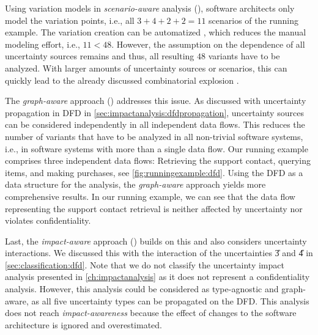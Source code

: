 Using variation models in \emph{scenario-aware} analysis (), software architects only model the variation points, i.e., all $3 + 4 + 2 + 2 = 11$ scenarios of the running example.
The variation creation can be automatized \cite{walter_architecture-based_2023}, which reduces the manual modeling effort, i.e., $11 < 48$.
However, the assumption on the dependence of all uncertainty sources remains and thus, all resulting $48$ variants have to be analyzed.
With larger amounts of uncertainty sources or scenarios, this can quickly lead to the already discussed combinatorial explosion \cite{koziolek_automated_2011}.

The \emph{graph-aware} approach () addresses this issue.
As discussed with uncertainty propagation in \ac{DFD} in \autoref{sec:impactanalysis:dfdpropagation}, uncertainty sources can be considered independently in all independent data flows.
This reduces the number of variants that have to be analyzed in all non-trivial software systems, i.e., in software systems with more than a single data flow.
Our running example comprises three independent data flows: Retrieving the support contact, querying items, and making purchases, see \autoref{fig:runningexample:dfd}.
Using the \ac{DFD} as a data structure for the analysis, the \emph{graph-aware} approach yields more comprehensive results.
In our running example, we can see that the data flow representing the support contact retrieval is neither affected by uncertainty nor violates confidentiality.

Last, the \emph{impact-aware} approach () builds on this and also considers uncertainty interactions.
We discussed this with the interaction of the uncertainties \U{3} and \U{4} in \autoref{sec:classification:dfd}.
Note that we do not classify the uncertainty impact analysis presented in \autoref{ch:impactanalysis} as it does not represent a confidentiality analysis.
However, this analysis could be considered as type-agnostic and graph-aware, as all five uncertainty types can be propagated on the \ac{DFD}.
This analysis does not reach \emph{impact-awareness} because the effect of changes to the software architecture is ignored and overestimated.

